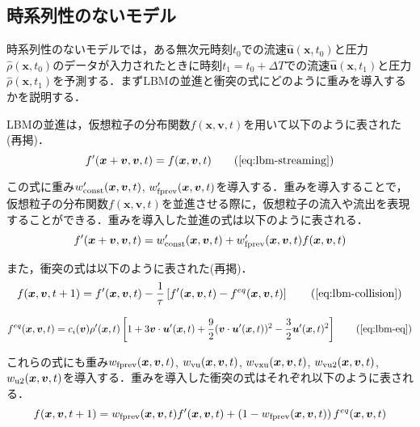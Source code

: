 \subsection{時系列性のないモデル\label{subsection:time-series-less-model}}
時系列性のないモデルでは，ある無次元時刻$t_0$での流速$\hat{\bm{u}}(\bm{x}, t_0)$と圧力$\hat{\rho}(\bm{x}, t_0)$のデータが入力されたときに時刻$t_1 = t_0 + \Delta T$での流速$\hat{\bm{u}}(\bm{x}, t_1)$と圧力$\hat{\rho}(\bm{x}, t_1)$を予測する．まずLBMの並進と衝突の式にどのように重みを導入するかを説明する．

LBMの並進は，仮想粒子の分布関数$f(\bm{x}, \bm{v}, t)$を用いて以下のように表された(再掲)．
\begin{equation}
  f'(\bm{x}+\bm{v}, \bm{v}, t)
  = f(\bm{x}, \bm{v}, t)
  \tag{\ref{eq:lbm-streaming}}
\end{equation}

この式に重み$w'_{\rm{const}}(\bm{x}, \bm{v}, t)$, $w'_{\rm{fprev}}(\bm{x}, \bm{v}, t)$を導入する．重みを導入することで，仮想粒子の分布関数$f(\bm{x}, \bm{v}, t)$を並進させる際に，仮想粒子の流入や流出を表現することができる．重みを導入した並進の式は以下のように表される．
\begin{equation}
  f'(\bm{x}+\bm{v}, \bm{v}, t) = 
  w'_{\rm{const}}(\bm{x}, \bm{v}, t) + 
  w'_{\rm{fprev}}(\bm{x}, \bm{v}, t) f(\bm{x}, \bm{v}, t)
  \label{eq:weighted-streaming}
\end{equation}

また，衝突の式は以下のように表された(再掲)．
\begin{equation}
  f(\bm{x}, \bm{v}, t+1) = 
  f'(\bm{x}, \bm{v}, t) - 
  \frac{1}{\tau} \left[ 
    f'(\bm{x}, \bm{v}, t) - f^{eq}(\bm{x}, \bm{v}, t) 
  \right]
  \tag{\ref{eq:lbm-collision}}
\end{equation}

\begin{equation}
  f^{eq}(\bm{x}, \bm{v}, t) = 
  c_i(\bm{v}) \rho'(\bm{x}, t) \left[ 
    1 
    + 3\bm{v} \cdot \bm{u}'(\bm{x}, t) 
    + \frac{9}{2}(\bm{v} \cdot \bm{u}'(\bm{x}, t))^2 
    - \frac{3}{2}\bm{u}'(\bm{x}, t)^2 
  \right]
  \tag{\ref{eq:lbm-eq}}
\end{equation}

これらの式にも重み$w_{\rm{fprev}}(\bm{x}, \bm{v}, t)$, $w_{\rm{vu}}(\bm{x}, \bm{v}, t)$, $w_{\rm{vxu}}(\bm{x}, \bm{v}, t)$, $w_{\rm{vu2}}(\bm{x}, \bm{v}, t)$, $w_{\rm{u2}}(\bm{x}, \bm{v}, t)$を導入する．重みを導入した衝突の式はそれぞれ以下のように表される．
\begin{equation}
  f(\bm{x}, \bm{v}, t+1) = 
  w_{\rm{fprev}}(\bm{x}, \bm{v}, t) f'(\bm{x}, \bm{v}, t) 
  + \left(1 - w_{\rm{fprev}}(\bm{x}, \bm{v}, t)\right) f^{eq}(\bm{x}, \bm{v}, t)
  \label{eq:weighted-collision}
\end{equation}


